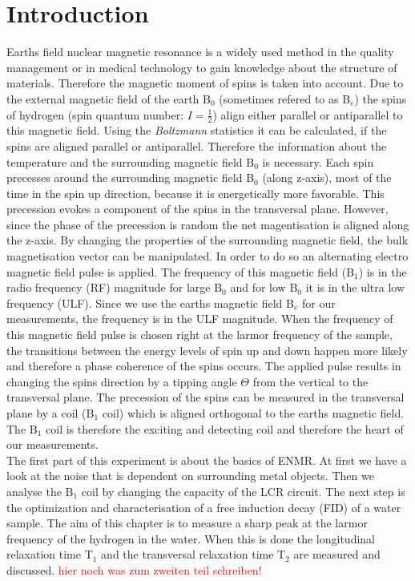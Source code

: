 \section{Introduction}
\label{sec:Introduction}
Earths field nuclear magnetic resonance is a widely used method in the quality management or in medical technology to gain knowledge about the structure of materials.
Therefore the magnetic moment of spins is taken into account.\newline
Due to the external magnetic field of the earth B$_0$ (sometimes refered to as B$_e$) the spins of hydrogen (spin quantum number: $I=\frac{1}{2}$) align either parallel or antiparallel to this magnetic field.
Using the \textit{Boltzmann} statistics it can be calculated, if the spins are aligned parallel or antiparallel.
Therefore the information about the temperature and the surrounding magnetic field B$_0$ is necessary.
Each spin precesses around the surrounding magnetic field B$_0$ (along z-axis), most of the time in the spin up direction, because it is energetically more favorable.
This precession evokes a component of the spins in the transversal plane.
However, since the phase of the precession is random the net magentisation is aligned along the z-axis.
By changing the properties of the surrounding magnetic field, the bulk magnetisation vector can be manipulated.
In order to do so an alternating electro magnetic field pulse is applied.
The frequency of this magnetic field (B$_1$) is in the radio frequency (RF) magnitude for large B$_0$ and for low B$_0$ it is in the ultra low frequency (ULF).
Since we use the earths magnetic field B$_e$ for our measurements, the frequency is in the ULF magnitude.
When the frequency of this magnetic field pulse is chosen right at the larmor frequency of the sample, the transitions between the energy levels of spin up and down happen more likely and therefore a phase coherence of the spins occurs.
The applied pulse results in changing the spins direction by a tipping angle $\Theta$ from the vertical to the transversal plane.
The precession of the spins can be measured in the transversal plane by a coil (B$_1$ coil) which is aligned orthogonal to the earths magnetic field.
The B$_1$ coil is therefore the exciting and detecting coil and therefore the heart of our measurements. \\
The first part of this experiment is about the basics of ENMR.
At first we have a look at the noise that is dependent on surrounding metal objects.
Then we analyse the B$_1$ coil by changing the capacity of the LCR circuit.
The next step is the optimization and characterisation of a free induction decay (FID) of a water sample.
The aim of this chapter is to measure a sharp peak at the larmor frequency of the hydrogen in the water.
When this is done the longitudinal relaxation time T$_1$ and the transversal relaxation time T$_2$ are measured and discussed.
\textcolor{red}{hier noch was zum zweiten teil schreiben!}